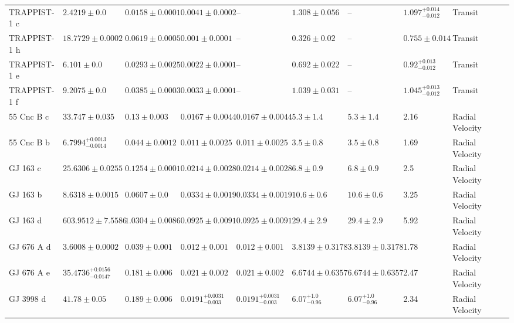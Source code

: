 \begin{tabular}{llllllllll}
TRAPPIST-1 c & $2.4219 \pm 0.0$ & $0.0158 \pm 0.0001$ & $0.0041 \pm 0.0002$ & -- & $1.308 \pm 0.056$ & -- & $1.097^{+0.014}_{-0.012}$ & Transit & \cite{AGOL_ET_AL__2021} \\
TRAPPIST-1 h & $18.7729 \pm 0.0002$ & $0.0619 \pm 0.0005$ & $0.001 \pm 0.0001$ & -- & $0.326 \pm 0.02$ & -- & $0.755 \pm 0.014$ & Transit & \cite{AGOL_ET_AL__2021} \\
TRAPPIST-1 e & $6.101 \pm 0.0$ & $0.0293 \pm 0.0025$ & $0.0022 \pm 0.0001$ & -- & $0.692 \pm 0.022$ & -- & $0.92^{+0.013}_{-0.012}$ & Transit & \cite{AGOL_ET_AL__2021} \\
TRAPPIST-1 f & $9.2075 \pm 0.0$ & $0.0385 \pm 0.0003$ & $0.0033 \pm 0.0001$ & -- & $1.039 \pm 0.031$ & -- & $1.045^{+0.013}_{-0.012}$ & Transit & \cite{AGOL_ET_AL__2021} \\
55 Cnc B c & $33.747 \pm 0.035$ & $0.13 \pm 0.003$ & $0.0167 \pm 0.0044$ & $0.0167 \pm 0.0044$ & $5.3 \pm 1.4$ & $5.3 \pm 1.4$ & 2.16 & Radial Velocity & \cite{MOUTOU_ET_AL_2026} \\
55 Cnc B b & $6.7994^{+0.0013}_{-0.0014}$ & $0.044 \pm 0.0012$ & $0.011 \pm 0.0025$ & $0.011 \pm 0.0025$ & $3.5 \pm 0.8$ & $3.5 \pm 0.8$ & 1.69 & Radial Velocity & \cite{MOUTOU_ET_AL_2026} \\
GJ 163 c & $25.6306 \pm 0.0255$ & $0.1254 \pm 0.0001$ & $0.0214 \pm 0.0028$ & $0.0214 \pm 0.0028$ & $6.8 \pm 0.9$ & $6.8 \pm 0.9$ & 2.5 & Radial Velocity & \cite{BONFILS_ET_AL__2013} \\
GJ 163 b & $8.6318 \pm 0.0015$ & $0.0607 \pm 0.0$ & $0.0334 \pm 0.0019$ & $0.0334 \pm 0.0019$ & $10.6 \pm 0.6$ & $10.6 \pm 0.6$ & 3.25 & Radial Velocity & \cite{BONFILS_ET_AL__2013} \\
GJ 163 d & $603.9512 \pm 7.5586$ & $1.0304 \pm 0.0086$ & $0.0925 \pm 0.0091$ & $0.0925 \pm 0.0091$ & $29.4 \pm 2.9$ & $29.4 \pm 2.9$ & 5.92 & Radial Velocity & \cite{BONFILS_ET_AL__2013} \\
GJ 676 A d & $3.6008 \pm 0.0002$ & $0.039 \pm 0.001$ & $0.012 \pm 0.001$ & $0.012 \pm 0.001$ & $3.8139 \pm 0.3178$ & $3.8139 \pm 0.3178$ & 1.78 & Radial Velocity & \cite{FENG_ET_AL__2022} \\
GJ 676 A e & $35.4736^{+0.0156}_{-0.0147}$ & $0.181 \pm 0.006$ & $0.021 \pm 0.002$ & $0.021 \pm 0.002$ & $6.6744 \pm 0.6357$ & $6.6744 \pm 0.6357$ & 2.47 & Radial Velocity & \cite{FENG_ET_AL__2022} \\
GJ 3998 d & $41.78 \pm 0.05$ & $0.189 \pm 0.006$ & $0.0191^{+0.0031}_{-0.003}$ & $0.0191^{+0.0031}_{-0.003}$ & $6.07^{+1.0}_{-0.96}$ & $6.07^{+1.0}_{-0.96}$ & 2.34 & Radial Velocity & \cite{STEFANOV_ET_AL__2025} \\

\end{tabular}
